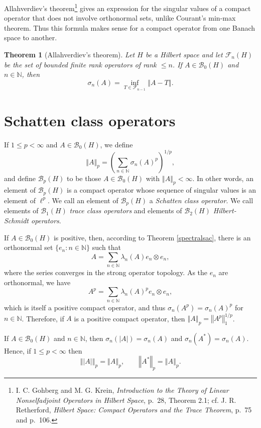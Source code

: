 \documentclass{article}
\newcommand{\norm}[1]{\left\Vert #1 \right\Vert}
\newtheorem{theorem}{Theorem}
\theoremstyle{definition}
\begin{document}
Allahverdiev's theorem\footnote{I. C. Gohberg and M. G. Krein, {\em Introduction to the Theory
of Linear Nonselfadjoint Operators in Hilbert Space}, p.~28, Theorem
2.1; cf. J. R. Retherford, {\em Hilbert Space: Compact Operators and the Trace Theorem}, p.~75 and
p.~106.} gives an expression for the singular values of a compact operator that does not involve orthonormal
sets, unlike Courant's min-max theorem. Thus this formula makes sense for a compact operator from one Banach space to another. 


\begin{theorem}[Allahverdiev's theorem]
Let $H$ be a Hilbert space and let $\mathscr{F}_n(H)$ be the set of bounded finite rank operators of rank $\leq n$. If $A \in \mathscr{B}_0(H)$
and $n \in \mathbb{N}$, then
\[
\sigma_n(A) = \inf_{T \in \mathscr{F}_{n-1}} \norm{A-T}. 
\]
\end{theorem}




\section{Schatten class operators}
If $1 \leq p < \infty$ and
$A \in \mathscr{B}_0(H)$, we define
\[
\norm{A}_p=\left( \sum_{n \in \mathbb{N}} \sigma_n(A)^p \right)^{1/p},
\]
and define $\mathscr{B}_p(H)$ to be those $A \in \mathscr{B}_0(H)$ with $\norm{A}_p < \infty$. In other words, an element of $\mathscr{B}_p(H)$ is a 
compact operator whose sequence of singular values is an element of $\ell^p$. We call an element of $\mathscr{B}_p(H)$ a {\em Schatten class operator}.
We call elements of $\mathscr{B}_1(H)$ {\em trace class operators} and elements of $\mathscr{B}_2(H)$ {\em Hilbert-Schmidt operators}.

If $A \in \mathscr{B}_0(H)$ is positive, then, according to Theorem \ref{spectralsac}, there is an orthonormal
set $\{e_n: n \in \mathbb{N}\}$ such that
\[
A = \sum_{n \in \mathbb{N}} \lambda_n(A)  e_n \otimes e_n,
\]
where the series converges in the strong operator topology. As the $e_n$ are orthonormal, we have
\[
A^p = \sum_{n \in \mathbb{N}} \lambda_n(A)^p e_n \otimes e_n,
\]
which is itself a positive compact operator, and thus
$\sigma_n(A^p)=\sigma_n(A)^p$ for $n \in \mathbb{N}$. Therefore, if $A$ is a positive compact operator, then
$\norm{A}_p = \norm{A^p}_1^{1/p}$.

If $A \in \mathscr{B}_0(H)$ and $n \in \mathbb{N}$, then 
$\sigma_n(|A|)=\sigma_n(A)$ and $\sigma_n(A^*)=\sigma_n(A)$. Hence, if $1 \leq p < \infty$ then
\[
\norm{|A|}_p = \norm{A}_p, \qquad \norm{A^*}_p=\norm{A}_p.
\]
\end{document}
